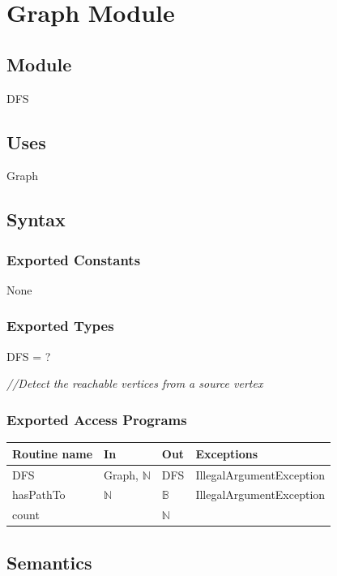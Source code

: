 \documentclass[12pt]{article}
\begin{document}
\section* {Graph Module}

\subsection*{Module}

DFS

\subsection* {Uses}

Graph

\subsection* {Syntax}

\subsubsection* {Exported Constants}

None

\subsubsection* {Exported Types}

DFS = ?

\noindent \textit{//Detect the reachable vertices from a source vertex}

\subsubsection* {Exported Access Programs}

\begin{tabular}{| l | l | l | l |}
\hline
\textbf{Routine name} & \textbf{In} & \textbf{Out} & \textbf{Exceptions}\\
\hline
DFS & Graph, $\mathbb{N}$  & DFS & IllegalArgumentException\\
\hline
hasPathTo & $\mathbb{N}$ & $\mathbb{B}$ & IllegalArgumentException\\
\hline
count & ~ & $\mathbb{N}$ & ~\\
\hline
\end{tabular}


\subsection* {Semantics}
\end{document}
